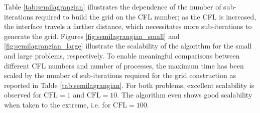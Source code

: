Table \ref{tab:semilagrangian} illustrates the dependence of the number of sub-iterations required to build the grid on the CFL number; as the CFL is increased, the interface travels a farther distance, which necessitates more sub-iterations to generate the grid. Figures \ref{fig:semilagrangian_small} and \ref{fig:semilagrangian_large} illustrate the scalability of the algorithm for the small and large problems, respectively. To enable meaningful comparisons between different CFL numbers and number of processes, the maximum time has been scaled by the number of sub-iterations required for the grid construction as reported in Table \ref{tab:semilagrangian}. For both problems, excellent scalability is observed for $\text{CFL} = 1$ and $\text{CFL} = 10$. The algorithm even shows good scalability when taken to the extreme, i.e. for $\text{CFL} = 100$.

